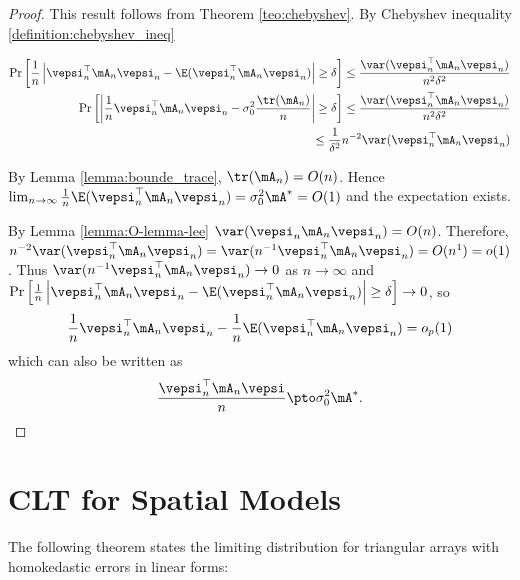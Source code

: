 \documentclass[english,12pt]{book}\usepackage[]{graphicx}\usepackage[]{xcolor}
\begin{document}
\begin{proof}
 This result follows from Theorem \ref{teo:chebyshev}. By Chebyshev inequality \ref{definition:chebyshev_ineq}
 
 \begin{equation*}
 \begin{aligned}
  \Pr\left[\frac{1}{n}\left|\vepsi_n^\top \mA_n \vepsi_n - \E(\vepsi_n^\top \mA_n \vepsi_n)\right|\geq \delta \right] \leq \frac{\var(\vepsi_n^\top \mA_n \vepsi_n)}{n^2 \delta^2} \\
    \Pr\left[\left|\frac{1}{n}\vepsi_n^\top \mA_n \vepsi_n - \sigma^2_{0}\frac{\tr(\mA_n)}{n}\right|\geq \delta \right] \leq \frac{\var(\vepsi_n^\top \mA_n \vepsi_n)}{n^2\delta^2}  \\
    \leq \frac{1}{\delta^2}n^{-2}\var(\vepsi_n^\top \mA_n \vepsi_n)
 \end{aligned}
 \end{equation*}
 
 By Lemma \ref{lemma:bounde_trace}, $\tr(\mA_n) = O(n)$. Hence $\lim_{n\to\infty} \frac{1}{n}\E(\vepsi_n^\top \mA_n \vepsi_n) = \sigma_{0}^2\mA^* = O(1)$ and the expectation exists. 
 
 By Lemma \ref{lemma:O-lemma-lee} $\var(\vepsi_n\mA_n\vepsi_n) = O(n)$. Therefore, $n^{-2}\var(\vepsi_n^\top \mA_n \vepsi_n) = \var(n^{-1}\vepsi_n^\top \mA_n \vepsi_n) = O(n^{1}) = o(1)$. Thus $\var(n^{-1}\vepsi_n^\top \mA_n \vepsi_n)\to 0$ as $n\to \infty$ and $\Pr\left[\frac{1}{n}\left|\vepsi_n^\top \mA_n \vepsi_n - \E(\vepsi_n^\top \mA_n \vepsi_n)\right|\geq \delta \right]\to 0$, so 
\begin{equation*}
\frac{1}{n}\vepsi_n^\top\mA_n\vepsi_n - \frac{1}{n}\E(\vepsi_n^\top \mA_n\vepsi_n) = o_p(1)
\end{equation*}
%
which can also be written as
\begin{equation*}
  \frac{\vepsi_n^\top \mA_n \vepsi}{n}\pto \sigma^2_0\mA^*.
\end{equation*}

\end{proof}


\section{CLT for Spatial Models}


The following theorem states the limiting distribution for triangular arrays with homokedastic errors in linear forms:
\end{document}
